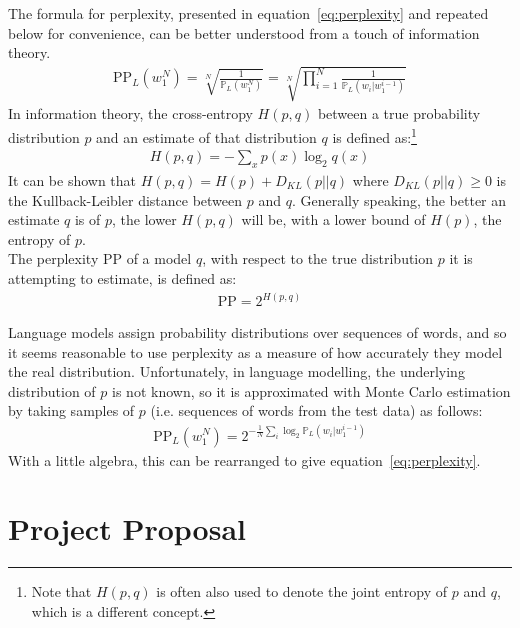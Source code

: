 \documentclass[a4paper, 12pt]{report}
\begin{document}
The formula for perplexity, presented in equation~\ref{eq:perplexity} and repeated below for convenience, can be better understood from a touch of information theory.
\begin{gather*}
	\text{PP}_L(w_1^N) = \sqrt[N]{\frac{1}{\mathbb{P}_L(w_1^N)}} = \sqrt[N]{\prod_{i=1}^{N}\frac{1}{\mathbb{P}_L(w_i | w_1^{i-1})}}
\end{gather*}
In information theory, the cross-entropy $H(p, q)$ between a true probability distribution $p$ and an estimate of that distribution $q$ is defined as:\footnote{Note that $H(p, q)$ is often also used to denote the joint entropy of $p$ and $q$, which is a different concept.}
\begin{gather*}
	H(p, q) = -\sum_x p(x) \log_2 q(x)
\end{gather*}
It can be shown that $H(p, q) = H(p) + D_{KL}(p || q)$ where $D_{KL}(p || q) \geq 0$ is the Kullback-Leibler distance between $p$ and $q$. Generally speaking, the better an estimate $q$ is of $p$, the lower $H(p, q)$ will be, with a lower bound of $H(p)$, the entropy of $p$. \\

The perplexity PP of a model $q$, with respect to the true distribution $p$ it is attempting to estimate, is defined as:
\begin{gather*}
	\text{PP} = 2^{H(p, q)}
\end{gather*}

Language models assign probability distributions over sequences of words, and so it seems reasonable to use perplexity as a measure of how accurately they model the real distribution. Unfortunately, in language modelling, the underlying distribution of $p$ is not known, so it is approximated with Monte Carlo estimation by taking samples of $p$ (i.e. sequences of words from the test data) as follows:
\begin{gather*}
	\text{PP}_L(w_1^N) = 2^{-\frac{1}{N}\sum_i \log_2 \mathbb{P}_L(w_i | w_1^{i-1})}
\end{gather*}
With a little algebra, this can be rearranged to give equation~\ref{eq:perplexity}. \\

\chapter{Project Proposal}

\end{document}
